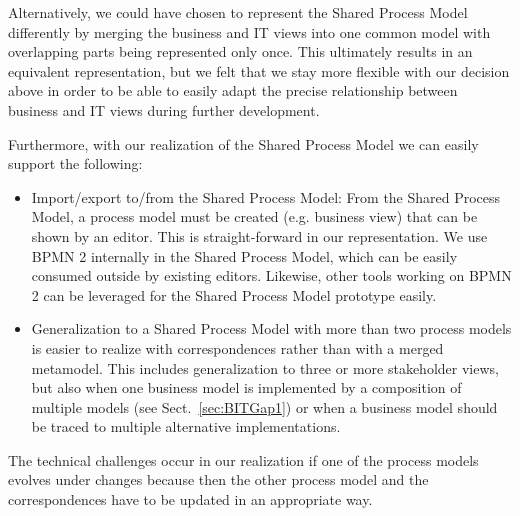 Alternatively, we could have chosen to represent the Shared Process Model differently by merging the business and IT views into one common model with overlapping parts being represented only once. This ultimately results in an equivalent representation, but we felt that we stay more flexible with our decision above in order to be able to easily adapt the precise relationship between business and IT views during further development.


Furthermore, with our realization of the Shared Process Model we can easily support the following:  
%
\begin{itemize}

\item Import/export to/from the Shared Process Model: From the Shared Process Model, a process model must be created (e.g. business view) that can be shown by an editor. This is straight-forward in our representation. We use BPMN 2 internally in the Shared Process Model, which can be easily consumed outside by existing editors. Likewise, other tools working on BPMN 2 can be leveraged for the Shared Process Model prototype easily.

\item Generalization to a Shared Process Model with more than two process models is easier to realize with correspondences rather than with a merged metamodel. This includes generalization to three or more stakeholder views, but also when one business model is implemented by a composition of multiple models (see Sect.~\ref{sec:BITGap1}) or when a business model should be traced to multiple alternative implementations.

\end{itemize}


The technical challenges occur in our realization if one of the process models evolves under changes because then the other process model and the correspondences have to be updated in an appropriate way.%



